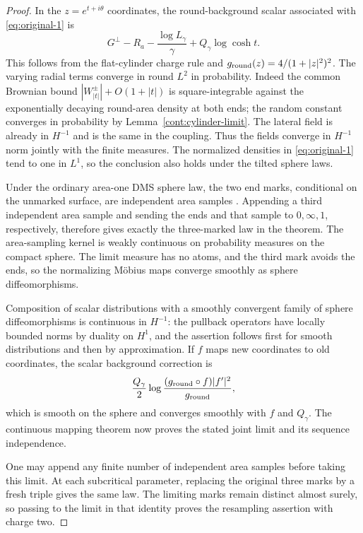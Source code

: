 \begin{proof}
In the $z=e^{t+i\theta}$ coordinates, the round-background scalar associated
with \eqref{eq:original-1} is
\[
 G^\perp-R_a-\frac{\log L_\gamma}{\gamma}
                       +Q_\gamma\log\cosh t.
\]
This follows from the flat-cylinder charge rule and
$g_{\rm round}(z)=4/(1+|z|^2)^2$.  The varying radial terms converge in round
$L^2$ in probability.  Indeed the common Brownian bound
$|W^\pm_{|t|}|+O(1+|t|)$ is square-integrable against the exponentially
decaying round-area density at both ends; the random constant converges in
probability by Lemma~\ref{cont:cylinder-limit}.  The lateral field is already
in $H^{-1}$ and is the same in the coupling.  Thus the fields converge in
$H^{-1}$ norm jointly with the finite measures.  The normalized densities
in \eqref{eq:original-1} tend to one in $L^1$, so the conclusion also holds
under the tilted sphere laws.

Under the ordinary area-one DMS sphere law, the two end marks, conditional
on the unmarked surface, are independent area samples
\cite[Proposition A.13]{DMS}.  Appending a third independent area sample and
sending the ends and that sample to $0,\infty,1$, respectively, therefore
gives exactly the three-marked law in the theorem.  The area-sampling kernel
is weakly continuous on probability measures on the compact sphere.  The
limit measure has no atoms, and the third mark avoids the ends, so the
normalizing M\"obius maps converge smoothly as sphere diffeomorphisms.

Composition of scalar distributions with a smoothly convergent family of
sphere diffeomorphisms is continuous in $H^{-1}$: the pullback operators have
locally bounded norms by duality on $H^1$, and the assertion follows first
for smooth distributions and then by approximation.  If $f$ maps new
coordinates to old coordinates, the scalar background correction is
\[
 \frac{Q_\gamma}{2}
 \log\frac{(g_{\rm round}\circ f)|f'|^2}{g_{\rm round}},
\]
which is smooth on the sphere and converges smoothly with $f$ and
$Q_\gamma$.  The continuous mapping theorem now proves the stated joint
limit and its sequence independence.

One may append any finite number of independent area samples before taking
this limit.  At each subcritical parameter, replacing the original three
marks by a fresh triple gives the same law.  The limiting marks remain
distinct almost surely, so passing to the limit in that identity proves the
resampling assertion with charge two.
\end{proof}


